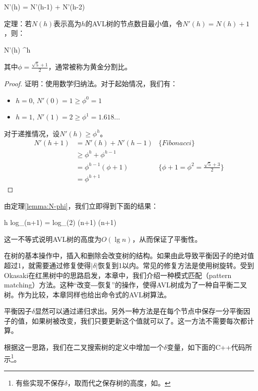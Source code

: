 \documentclass[UTF8]{article}
\begin{document}
\be
  N'(h) = N'(h-1) + N'(h-2)
\ee

\begin{lemma}
\label{lemma:N-phi}
定理：若$N(h)$表示高为$h$的AVL树的节点数目最小值，令$N'(h) = N(h) + 1$，则：

\be
  N'(h) \geq \phi^h
\ee

其中$\phi = \frac{\sqrt{5}+1}{2}$，通常被称为黄金分割比。
\end{lemma}

\begin{proof}
证明：使用数学归纳法。对于起始情况，我们有：
\begin{itemize}
\item $h=0$, $N'(0) = 1 \geq \phi^0 = 1$
\item $h=1$, $N'(1) = 2 \geq \phi^1 = 1.618...$
\end{itemize}

对于递推情况，设$N'(h) \geq \phi^h$。
\[
  \begin{array}{lll}
  N'(h+1) & = N'(h) + N'(h-1) & \{Fibonacci\} \\
          & \geq \phi^h + \phi^{h-1} & \\
          & = \phi^{h-1}(\phi + 1) & \{\phi + 1 = \phi^2 = \frac{\sqrt{5}+3}{2}\} \\
          & = \phi^{h+1}
 \end{array}
\]
\end{proof}

由定理\ref{lemma:N-phi}，我们立即得到下面的结果：

\be
  h \leq log_{\phi}(n+1) = log_{\phi}(2) \cdot \lg (n+1)  \lg (n+1)
  \label{eq:AVL-height}
\ee

这一不等式说明AVL树的高度为$O(\lg n)$，从而保证了平衡性。

在树的基本操作中，插入和删除会改变树的结构。如果由此导致平衡因子的绝对值超过1，就需要通过修复使得$|\delta|$恢复到1以内。常见的修复方法是使用树旋转。受到Okasaki在红黑树\cite{okasaki}中的思路启发，本章中，我们介绍一种模式匹配（pattern matching）方法。这种“改变―恢复”的操作，使得AVL树成为了一种自平衡二叉树。作为比较，本章同样也给出命令式的AVL树算法。

平衡因子$\delta$显然可以通过递归求出。另外一种方法是在每个节点中保存一分平衡因子的值，如果树被改变，我们只要更新这个值就可以了。这一方法不需要每次都计算。

根据这一思路，我们在二叉搜索树的定义中增加一个$\delta$变量，如下面的C++代码所示\footnote{有些实现不保存$\delta$，取而代之保存树的高度，如\cite{py-avl}。}。
\end{document}
